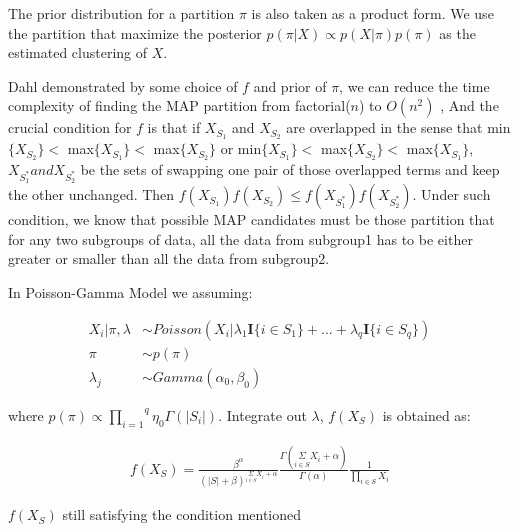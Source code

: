 \documentclass[aoas,preprint]{imsart}
\begin{document}
The prior distribution for a partition $\pi$ is also taken as a product form. We use the partition that maximize the posterior $p(\pi | X) \propto p(X|\pi) p(\pi)$ as the estimated clustering of $X$.

Dahl demonstrated by some choice of $f$ and prior of $\pi$, we can reduce the time complexity of finding the MAP partition from factorial($n$) to $O(n^2)$ \citep{ref:dahl},
And the crucial condition for $f$ is that if $X_{S_1}$ and $X_{S_2}$ are overlapped in the sense that  min$\{X_{S_2}\}  <$ max$\{X_{S_1}\}  <$ max$\{X_{S_2}\}$ or min$\{X_{S_1}\}  <$ max$\{X_{S_2}\}  <$ max$\{X_{S_1}\}$, $X_{S_1^*} and X_{S_2^*}$ be the sets of swapping one pair of those overlapped terms and keep the other unchanged. Then $f(X_{S_1}) f(X_{S_2}) \leq f(X_{S_1^*}) f(X_{S_2^*})$. Under such condition, we know that possible MAP candidates must be those partition that for any two subgroups of data, all the data from subgroup1 has to be either greater or smaller than all the data from subgroup2.


In Poisson-Gamma Model we assuming:

\begin{align*}
X_i | \pi, \lambda &\sim Poisson(X_i | \lambda_1\textbf{I}\{i\in S_1\} + ... + \lambda_q\textbf{I}\{i \in S_q\})\\
\pi &\sim p(\pi)\\
\lambda_j &\sim Gamma(\alpha_0, \beta_0)
\end{align*}

where $p(\pi)\propto \overset{q}{\underset{i = 1}{\prod}}\eta_0\Gamma(|S_i|)$. Integrate out $\lambda$, $f(X_{S})$ is obtained as:

\begin{eqnarray*}
f(X_{S}) = \frac{\beta^\alpha}{(|S| + \beta)^{\underset{i \in S}{\Sigma} X_i + \alpha}} \frac{\Gamma(\underset{i \in S}{\Sigma} X_i  + \alpha)}{\Gamma(\alpha)} \frac{1}{\underset{i \in S}{\prod }X_i}
\end{eqnarray*}

$f(X_S)$ still satisfying the condition mentioned
\end{document}
